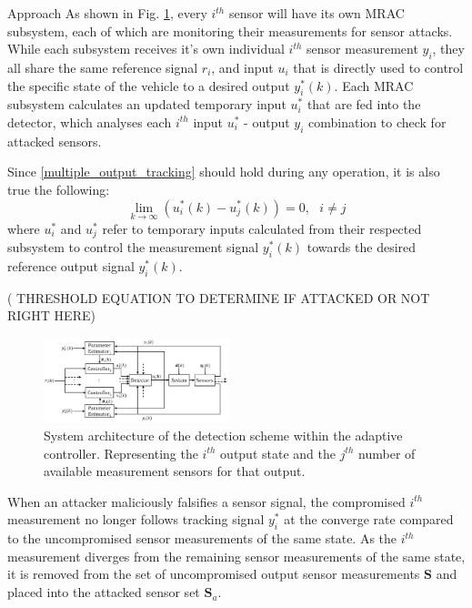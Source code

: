 \begin{section}{Approach}
As shown in Fig. \ref{fig:det_arch}, every $i^{th}$ sensor will have its own MRAC subsystem, each of which are monitoring their measurements for sensor attacks. While each subsystem receives it's own individual $i^{th}$ sensor measurement $y_i$, they all share the same reference signal $r_i$, and input $u_i$ that is directly used to control the specific state of the vehicle to a desired output $y_i^*(k)$. Each MRAC subsystem calculates an updated temporary input $u^*_i$ that are fed into the detector, which analyses each $i^{th}$ input $u^*_i$ - output $y_i$ combination to check for attacked sensors. 



Since \eqref{multiple_output_tracking} should hold during any operation, it is also true the following:
\begin{equation}
    \lim_{k\to\infty}(u^*_i(k)-u^*_j(k))=0, \text{ }i\neq j
\end{equation}
where $u^*_i$ and $u^*_j$ refer to temporary inputs calculated from their respected subsystem to control the measurement signal $y_i^*(k)$ towards the desired reference output signal $y_i^*(k)$.


( THRESHOLD EQUATION TO DETERMINE IF ATTACKED OR NOT RIGHT HERE)

\begin{figure}[ht!]
\vspace{1pt}
\centering
\includegraphics[width=0.48\textwidth]{con_and_det.png}
\caption{System architecture of the detection scheme within the adaptive controller. Representing the $i^{th}$ output state and the $j^{th}$ number of available measurement sensors for that output.}
\label{fig:det_arch}
\end{figure}


When an attacker maliciously falsifies a sensor signal, the compromised $i^{th}$ measurement no longer follows tracking signal $y_i^*$ at the converge rate compared to the uncompromised sensor measurements of the same state. As the $i^{th}$ measurement diverges from the remaining sensor measurements of the same state, it is removed from the set of uncompromised output sensor measurements $\bm{S}$ and placed into the attacked sensor set $\bm{S}_a$.





\end{section}
